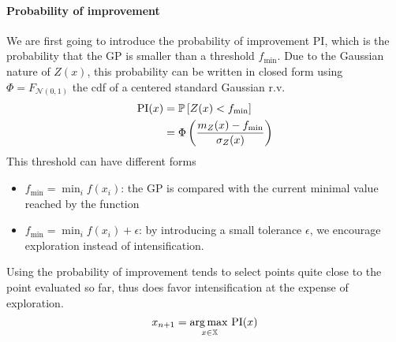 \documentclass[../../Main_ManuscritThese.tex]{subfiles}
\begin{document}
\paragraph{Probability of improvement}
We are first going to introduce the probability of improvement
$\mathrm{PI}$, which is the probability that the GP is smaller than a
threshold $f_{\min}$. Due to the Gaussian nature of $Z(x)$, this
probability can be written in closed form using
$\Phi = F_{\mathcal{N}(0, 1)}$ the cdf of a centered standard Gaussian
r.v.\
\begin{align}
  \mathrm{PI}(x) &= \Prob%
                   \left[Z(x) < f_{\min}\right] \\
                 &= \Phi\left(\frac{m_Z(x) - f_{\min}}{\sigma_Z(x)}\right)
\end{align}
This threshold can have different forms
\begin{itemize}
\item $f_{\min} = \min_{i} f(x_i)$: the GP is compared with the
  current minimal value reached by the function
\item $f_{\min} = \min_i f(x_i) + \epsilon$: by introducing a small
  tolerance $\epsilon$, we encourage exploration instead of
  intensification.
\end{itemize}
Using the probability of improvement tends to select points quite
close to the point evaluated so far, thus does favor intensification
at the expense of exploration.
\begin{equation}
  x_{n+1} = \operatorname*{arg\,max \,}_{x\in \mathbb{X}} \mathrm{PI}(x)
\end{equation}
\end{document}
